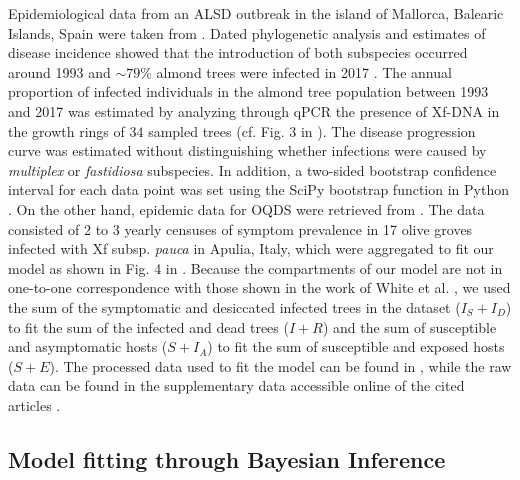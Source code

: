Epidemiological data from an ALSD outbreak in the island of Mallorca,
Balearic Islands, Spain were taken from \cite{Moralejo2020}. Dated phylogenetic
analysis and estimates of disease incidence showed that the introduction of
both subspecies occurred around 1993 and $\sim 79$\% almond trees were infected
in 2017 \cite{Moralejo2020}. The annual proportion of infected individuals in
the almond tree population between 1993 and 2017 was estimated by analyzing
through qPCR the presence of Xf-DNA in the growth rings of $34$ sampled trees
(cf. Fig. 3 in \cite{Moralejo2020}). The disease progression curve was
estimated without distinguishing whether infections were caused by
\textit{multiplex} or \textit{fastidiosa} subspecies. In addition, a two-sided
bootstrap confidence interval for each data point was set using the SciPy
bootstrap function in Python \cite{SciPy}. On the other hand, epidemic data
for OQDS were retrieved from \cite{White2020}. The data consisted of 2 to 3
yearly censuses of symptom prevalence in 17 olive groves infected with Xf
subsp. \textit{pauca} in Apulia, Italy, which were aggregated to fit our model
as shown in Fig. 4 in \cite{White2020}. Because the compartments of our model
are not in one-to-one correspondence with those shown in the work of White et
al. \cite{White2020}, we used the sum of the symptomatic and desiccated
infected trees in the dataset ($I_S+I_D$) to fit the sum of the infected and
dead trees ($I+R$) and the sum of susceptible and asymptomatic hosts ($S+I_A$)
to fit the sum of susceptible and exposed hosts ($S+E$). The processed data
used to fit the model can be found in \cite{CODE}, while the raw data can be
found in the supplementary data accessible online of the cited articles
\cite{Moralejo2020,White2020}.

\subsection{Model fitting through Bayesian Inference}

